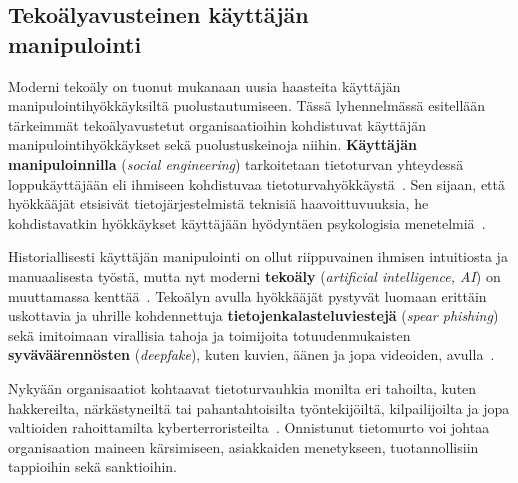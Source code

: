 

\begin{otherlanguage}{finnish}
\chapter*{Tekoälyavusteinen käyttäjän\\manipulointi\label{chapter:finnish}}

Moderni tekoäly on tuonut mukanaan uusia haasteita käyttäjän manipulointihyökkäyksiltä puolustautumiseen. Tässä lyhennelmässä esitellään tärkeimmät tekoälyavustetut organisaatioihin kohdistuvat käyttäjän manipulointihyökkäykset sekä puolustuskeinoja niihin. \textbf{Käyttäjän manipuloinnilla} (\textit{social engineering}) tarkoitetaan tietoturvan yhteydessä loppukäyttäjään eli ihmiseen kohdistuvaa tietoturvahyökkäystä~\citep{hatfield_SE_Evolution_Concept_2018}. Sen sijaan, että hyökkääjät etsisivät tietojärjestelmistä teknisiä haavoittuvuuksia, he kohdistavatkin hyökkäykset käyttäjään hyödyntäen psykologisia menetelmiä~\citep{wang_Defining_Social_Engineering_2020}.

Historiallisesti käyttäjän manipulointi on ollut riippuvainen ihmisen intuitiosta ja manuaalisesta työstä, mutta nyt moderni \textbf{tekoäly} (\textit{artificial intelligence, AI}) on muuttamassa kenttää~\citep{blauth_AI_Crime_Overview_Malicious_Use_Abuse_2022, king_AI_Crime_Interdisciplinary_Analysis_2019, mirsky_Threat_Offensive_AI_Organizations_2023}. Tekoälyn avulla hyökkääjät pystyvät luomaan erittäin uskottavia ja uhrille kohdennettuja \textbf{tietojenkalasteluviestejä} (\textit{spear phishing}) sekä imitoimaan virallisia tahoja ja toimijoita totuudenmukaisten \textbf{syväväärennösten} (\textit{deepfake}), kuten kuvien, äänen ja jopa videoiden, avulla~\citep{mirsky_Creation_Detection_Deepfakes_2021}.

Nykyään organisaatiot kohtaavat tietoturvauhkia monilta eri tahoilta, kuten hakkereilta, närkästyneiltä tai pahantahtoisilta työntekijöiltä, kilpailijoilta ja jopa valtioiden rahoittamilta kyberterroristeilta~\citep{mirsky_Threat_Offensive_AI_Organizations_2023}. Onnistunut tietomurto voi johtaa organisaation maineen kärsimiseen, asiakkaiden menetykseen, tuotannollisiin tappioihin sekä sanktioihin.


\end{otherlanguage}

